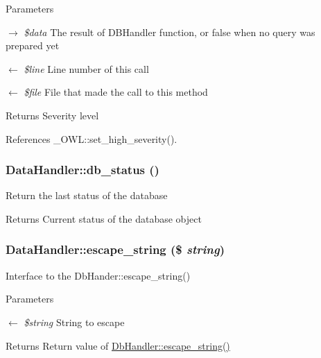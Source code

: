 \begin{DoxyParams}{Parameters}
\item[\mbox{$\rightarrow$} {\em \$data}]The result of DBHandler function, or false when no query was prepared yet \item[\mbox{$\leftarrow$} {\em \$line}]Line number of this call \item[\mbox{$\leftarrow$} {\em \$file}]File that made the call to this method \end{DoxyParams}
\begin{DoxyReturn}{Returns}
Severity level 
\end{DoxyReturn}


References \_\-OWL::set\_\-high\_\-severity().

\subsubsection[{db\_\-status}]{\setlength{\rightskip}{0pt plus 5cm}DataHandler::db\_\-status ()}\label{classDataHandler_a3c82ec0a40dabcc55dc203c96abf02d2}
Return the last status of the database

\begin{DoxyReturn}{Returns}
Current status of the database object 
\end{DoxyReturn}
\subsubsection[{escape\_\-string}]{\setlength{\rightskip}{0pt plus 5cm}DataHandler::escape\_\-string (\$ {\em string})}\label{classDataHandler_a435338a167a44a041af2895859abb0c9}
Interface to the DbHander::escape\_\-string()


\begin{DoxyParams}{Parameters}
\item[\mbox{$\leftarrow$} {\em \$string}]String to escape \end{DoxyParams}
\begin{DoxyReturn}{Returns}
Return value of \hyperlink{classDbHandler_a67d77702ff6db70f89123d3f947af143}{DbHandler::escape\_\-string()} 
\end{DoxyReturn}

